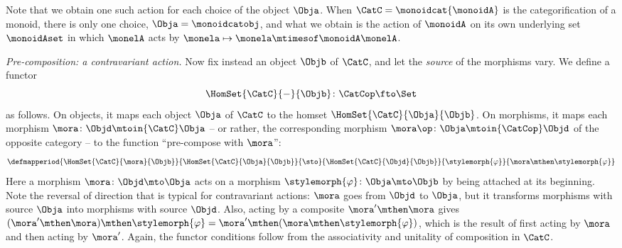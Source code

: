 Note that we obtain one such action for each choice of the object $\Obja$.
When $\CatC = \monoidcat{\monoidA}$ is the categorification of a monoid, there is only one choice, $\Obja = \monoidcatobj$, and what we obtain is the action of $\monoidA$ on its own underlying set $\monoidAset$ in which $\monelA$ acts by $\monela \mapsto \monela \mtimesof\monoidA \monelA$.

\emph{Pre-composition: a contravariant action.}
Now fix instead an object $\Objb$ of $\CatC$, and let the \emph{source} of the morphisms vary.
We define a functor
\begin{equation}
    \label{eq:contravariant-hom-functor-type}
    \HomSet{\CatC}{-}{\Objb} \colon \CatCop \fto \Set
\end{equation}
as follows.
On objects, it maps each object $\Obja$ of $\CatC$ to the homset $\HomSet{\CatC}{\Obja}{\Objb}$.
On morphisms, it maps each morphism $\mora \colon \Objd \mtoin{\CatC} \Obja$ -- or rather, the corresponding morphism $\mora\op \colon \Obja \mtoin{\CatCop} \Objd$ of the opposite category -- to the function ``pre-compose with $\mora$'':
\begin{equation}
    \label{eq:contravariant-hom-functor-on-morphisms}
    \defmapperiod{\HomSet{\CatC}{\mora}{\Objb}}{\HomSet{\CatC}{\Obja}{\Objb}}{\sto}{\HomSet{\CatC}{\Objd}{\Objb}}{\stylemorph{\varphi}}{\mora \mthen \stylemorph{\varphi}}
\end{equation}
Here a morphism $\mora \colon \Objd \mto \Obja$ acts on a morphism $\stylemorph{\varphi} \colon \Obja \mto \Objb$ by being attached at its beginning.
Note the reversal of direction that is typical for contravariant actions: $\mora$ goes from $\Objd$ to $\Obja$, but it transforms morphisms with source $\Obja$ into morphisms with source $\Objd$.
Also, acting by a composite $\mora' \mthen \mora$ gives $(\mora' \mthen \mora) \mthen \stylemorph{\varphi} = \mora' \mthen (\mora \mthen \stylemorph{\varphi})$, which is the result of first acting by $\mora$ and then acting by $\mora'$.
Again, the functor conditions follow from the associativity and unitality of composition in $\CatC$.

